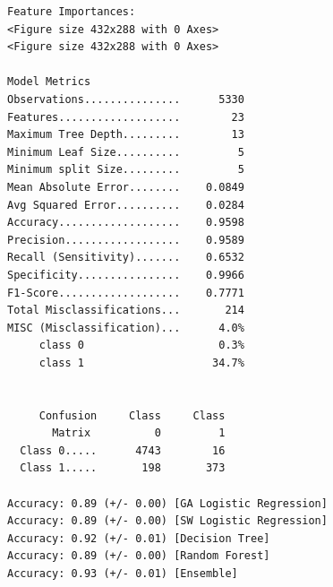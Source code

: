 \documentclass[12pt]{article}
\begin{document}
\begin{verbatim}
Feature Importances:
<Figure size 432x288 with 0 Axes>
<Figure size 432x288 with 0 Axes>

Model Metrics
Observations...............      5330
Features...................        23
Maximum Tree Depth.........        13
Minimum Leaf Size..........         5
Minimum split Size.........         5
Mean Absolute Error........    0.0849
Avg Squared Error..........    0.0284
Accuracy...................    0.9598
Precision..................    0.9589
Recall (Sensitivity).......    0.6532
Specificity................    0.9966
F1-Score...................    0.7771
Total Misclassifications...       214
MISC (Misclassification)...      4.0%
     class 0                     0.3%
     class 1                    34.7%


     Confusion     Class     Class
       Matrix          0         1
  Class 0.....      4743        16
  Class 1.....       198       373

Accuracy: 0.89 (+/- 0.00) [GA Logistic Regression]
Accuracy: 0.89 (+/- 0.00) [SW Logistic Regression]
Accuracy: 0.92 (+/- 0.01) [Decision Tree]
Accuracy: 0.89 (+/- 0.00) [Random Forest]
Accuracy: 0.93 (+/- 0.01) [Ensemble]

\end{verbatim}


%
%
\end{document}
